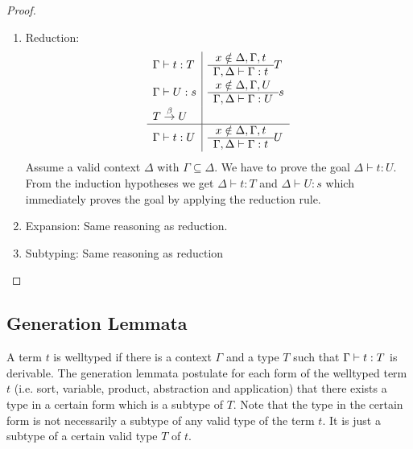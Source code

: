 \begin{lemma}
\begin{proof}
{\begin{enumerate}
\begin{enumerate}
                \item Reduction:
                $$
                \begin{array}{l|l}
                    \Gamma \vdash t: T
                    &
                    \begin{array}{c}  x \notin \Delta, \Gamma, t  \\ \hline  \Gamma,\Delta \vdash \Gamma : t \end{array} T
                    \\
                    \Gamma \vdash U: s
                    &
                    \begin{array}{c}  x \notin \Delta, \Gamma, U  \\ \hline  \Gamma,\Delta \vdash \Gamma : U \end{array} s
                    \\
                    T \stackrel{\beta}{\to} U
                    \\
                    \hline
                    \Gamma \vdash t : U
                    &
                    \begin{array}{c}  x \notin \Delta, \Gamma, t  \\ \hline  \Gamma,\Delta \vdash \Gamma : t \end{array} U
                \end{array}
                $$
                Assume a valid context $\Delta$ with $\Gamma \subseteq \Delta$.
                    We have to prove the goal $\Delta \vdash t: U$. From the
                    induction hypotheses we get $\Delta \vdash t: T$ and $\Delta
                    \vdash U : s$ which immediately proves the goal by applying
                    the reduction rule.

                \item Expansion: Same reasoning as reduction.

                \item Subtyping: Same reasoning as reduction

            \end{enumerate}
        \end{enumerate}
        }
    \end{proof}
\end{lemma}






\subsection{Generation Lemmata}

A term $t$ is welltyped if there is a context $\Gamma$ and a type $T$ such that
$\Gamma \vdash t: T$ is derivable. The generation lemmata postulate for each
form of the welltyped term $t$ (i.e. sort, variable, product, abstraction and
application) that there exists a type in a certain form which is a subtype of
$T$. Note that the type in the certain form is not necessarily a subtype of any
valid type of the term $t$. It is just a subtype of a certain valid type $T$ of
$t$.





